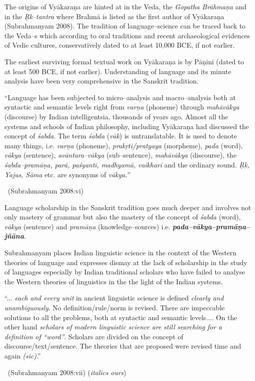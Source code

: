 The origins of Vyākaraṇa are hinted at in the Veda, the \textit{Gopatha Brāhmaṇa} and in the \textit{Ṛk–tantra} where Brahmā is listed as the first author of Vyākaraṇa (Subrahmanyam 2008). The tradition of language–science can be traced back to the Veda–s which according to oral traditions and recent archaeological evidences of Vedic cultures, conservatively dated to at least 10,000 BCE, if not earlier.

The earliest surviving formal textual work on Vyākaraṇa is by Pāṇini (dated to at least 500 BCE, if not earlier). Understanding of language and its minute analysis have been very comprehensive in the Sanskrit tradition.

\begin{myquote}
“Language has been subjected to micro–analysis and macro–analysis both at syntactic and semantic levels right from \textit{varṇa} (phoneme) through \textit{mahāvākya} (discourse) by Indian intelligentsia, thousands of years ago. Almost all the systems and schools of Indian philosophy, including Vyākaraṇa had discussed the concept of \textit{śabda}. The term \textit{śabda} (\textit{vāk}) is untranslatable. It is used to denote many things, i.e. \textit{varṇa} (phoneme), \textit{prakṛti/pratyaya} (morpheme), \textit{pada} (word), \textit{vākya} (sentence), \textit{avāntara–vākya} (sub–sentence), \textit{mahāvākya} (discourse), the \textit{śabda–pramāṇa, parā, paśyantī, madhyamā, vaikharī} and the ordinary sound. \textit{Ṛk, Yajus, Sāma} etc. are synonyms of \textit{vākya.}” 

~\hfill (Subrahmanyam 2008:vi)
\end{myquote}

Language scholarship in the Sanskrit tradition goes much deeper and involves not only mastery of grammar but also the mastery of the concept of \textit{śabda} (word), \textit{vākya} (sentence) and \textit{pramāṇa} (knowledge–sources) i.e. \textbf{\textit{pada–vākya–pramāṇa–jñāna}}.

Subrahmanyam places Indian linguistic science in the context of the Western theories of language and expresses dismay at the lack of scholarship in the study of languages especially by Indian traditional scholars who have failed to analyse the Western theories of linguistics in the the light of the Indian systems.

\begin{myquote}
“... \textit{each and every unit} in ancient linguistic science is defined \textit{clearly and unambiguously}. No definition/rule/norm is revised. There are impeccable solutions to all the problems, both at syntactic and semantic levels.... On the other hand \textit{scholars of modern linguistic science are still searching for a definition of “word”}. Scholars are divided on the concept of discourse/text/sentence. The theories that are proposed were revised time and again \textit{(sic)}.” 

~\hfill (Subrahmanyam 2008:vii) (\textit{italics ours})
\end{myquote}

